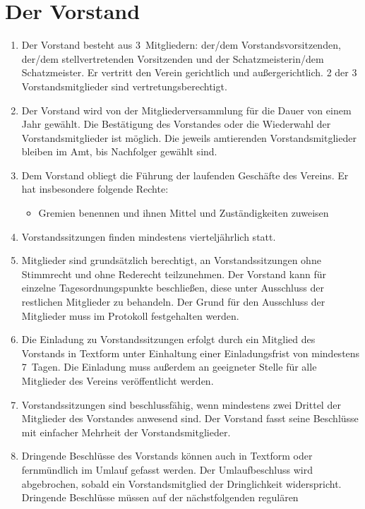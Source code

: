 \documentclass[a4paper,12pt]{scrartcl}
\begin{document}
\section{Der Vorstand}
\begin{enumerate}
  \item Der Vorstand besteht aus 3~Mitgliedern: der/dem Vorstandsvorsitzenden,
    der/dem stellvertretenden Vorsitzenden und der Schatzmeisterin/dem
    Schatzmeister. Er vertritt den Verein gerichtlich und außergerichtlich. 2
    der 3 Vorstandsmitglieder sind vertretungsberechtigt.
  \item Der Vorstand wird von der Mitgliederversammlung für die Dauer von einem
    Jahr gewählt. Die Bestätigung des Vorstandes oder die Wiederwahl der
    Vorstandsmitglieder ist möglich. Die jeweils amtierenden Vorstandsmitglieder
    bleiben im Amt, bis Nachfolger gewählt sind.
  \item Dem Vorstand obliegt die Führung der laufenden Geschäfte des Vereins. Er
    hat insbesondere folgende Rechte:
    \begin{itemize}
      \item Gremien benennen und ihnen Mittel und Zuständigkeiten zuweisen
    \end{itemize}
  \item Vorstandssitzungen finden mindestens vierteljährlich statt.
  \item Mitglieder sind grundsätzlich berechtigt, an Vorstandssitzungen ohne
    Stimmrecht und ohne Rederecht teilzunehmen. Der Vorstand kann für einzelne
    Tagesordnungspunkte beschließen, diese unter Ausschluss der restlichen
    Mitglieder zu behandeln. Der Grund für den Ausschluss der Mitglieder muss im
    Protokoll festgehalten werden.
  \item Die Einladung zu Vorstandssitzungen erfolgt durch ein Mitglied des
    Vorstands in Textform unter Einhaltung einer Einladungsfrist von mindestens
    7~Tagen. Die Einladung muss außerdem an geeigneter Stelle für alle Mitglieder
    des Vereins veröffentlicht werden.
  \item Vorstandssitzungen sind beschlussfähig, wenn mindestens zwei Drittel der
    Mitglieder des Vorstandes anwesend sind. Der Vorstand fasst seine Beschlüsse
    mit einfacher Mehrheit der Vorstandsmitglieder.
  \item Dringende Beschlüsse des Vorstands können auch in Textform oder
    fernmündlich im Umlauf gefasst werden. Der Umlaufbeschluss 
    wird abgebrochen, sobald ein Vorstandsmitglied der Dringlichkeit
    widerspricht. Dringende Beschlüsse müssen auf der nächstfolgenden regulären

\end{enumerate}
\end{document}
